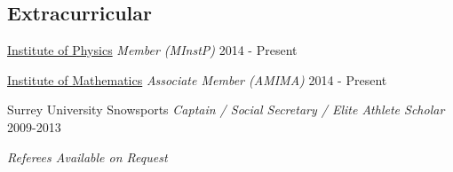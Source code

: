 \documentclass[margin, line]{res}
\newcommand{\IOP}{http://www.iop.org}
\newcommand{\IOM}{http://www.ima.org.uk}
\newcommand{\susnow}{}%
\newcommand{\eussc}{}%
\newcommand{\Colours}{http://www.ussu.co.uk/ClubsSocieties/Sport/Colours\%20Documents/Colours\%20-\%20Individual\%20Club\%20Exceptions\%20to\%20Colours\%20Criteria\%202015.pdf}
\newcommand{\Investors}{}%
\newenvironment{list2}{
	\begin{list}{$\bullet$}{%
		\setlength{\itemsep}{0in}
		\setlength{\parsep}{0in} \setlength{\parskip}{0in}
		\setlength{\topsep}{0in} \setlength{\partopsep}{0in}
		\setlength{\leftmargin}{0.2in}}}{\end{list}}
\begin{document}
\begin{resume}
\vspace{0.0in}
\section{\sc Extracurricular}
{\href{\IOP}{Institute of Physics}}
\vspace*{-.0in}
{\em Member (MInstP)} \hfill { 2014 - Present} \\
\vspace*{-0.3in}

{\href{\IOM}{Institute of Mathematics}}
{\em Associate Member (AMIMA)} \hfill { 2014 - Present} \\
\vspace*{-0.3in}

{\susnow}{Surrey University Snowsports}
    {\em Captain / Social Secretary / Elite Athlete Scholar} \hfill {2009-2013}


\vspace{0.2in}
\centerline{\emph{Referees Available on Request}}

\end{resume}
\end{document}
